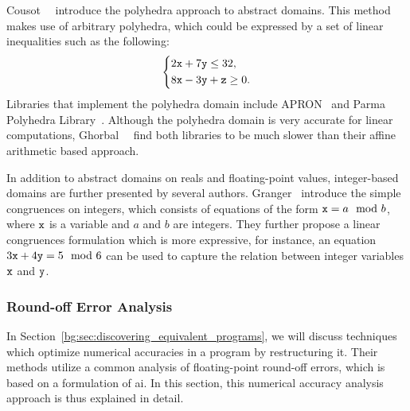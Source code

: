Cousot~\etal~\cite{cousot78} introduce the polyhedra approach to abstract
domains.  This method makes use of arbitrary polyhedra, which could be
expressed by a set of linear inequalities such as the following:
\begin{equation}
    \left\{
    \begin{aligned}
        & 2\texttt{x} + 7\texttt{y} \leq 32, \\
        & 8\texttt{x} - 3\texttt{y} + \texttt{z} \geq 0.
    \end{aligned}
    \right.
\end{equation}
Libraries that implement the polyhedra domain include APRON~\cite{apron} and
Parma Polyhedra Library~\cite{ppl}.  Although the polyhedra domain is very
accurate for linear computations, Ghorbal~\etal~\cite{ghorbal09} find both
libraries to be much slower than their affine arithmetic based approach.

In addition to abstract domains on reals and floating-point values,
integer-based domains are further presented by several authors.
Granger~\cite{granger89} introduce the simple congruences on integers,
which consists of equations of the form $\texttt{x} = a \mod b$, where $\texttt{x}$
is a variable and $a$ and $b$ are integers.  They further propose a linear
congruences formulation which is more expressive, for instance, an equation $3
\texttt{x} + 4 \texttt{y} = 5 \mod 6$ can be used to capture the relation between integer
variables $\texttt{x}$ and $\texttt{y}$.

\subsubsection{Round-off Error Analysis}
\label{bg:ssub:accuracy}


In Section~\ref{bg:sec:discovering_equivalent_programs}, we will discuss
techniques which optimize numerical accuracies in a program by restructuring
it.  Their methods utilize a common analysis of floating-point round-off
errors, which is based on a formulation of \gls{ai}\@.  In this section, this
numerical accuracy analysis approach is thus explained in detail.

